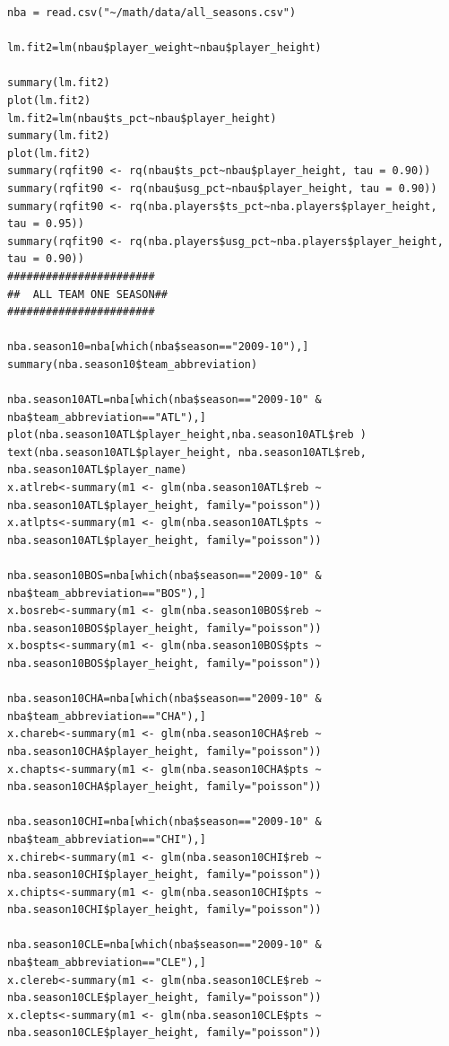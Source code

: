 \documentclass[11pt,letterpaper]{amsart}
\begin{document}
\begin{lstlisting}[breaklines]
nba = read.csv("~/math/data/all_seasons.csv")

lm.fit2=lm(nbau$player_weight~nbau$player_height)

summary(lm.fit2)
plot(lm.fit2)
lm.fit2=lm(nbau$ts_pct~nbau$player_height)
summary(lm.fit2)
plot(lm.fit2)
summary(rqfit90 <- rq(nbau$ts_pct~nbau$player_height, tau = 0.90))
summary(rqfit90 <- rq(nbau$usg_pct~nbau$player_height, tau = 0.90))
summary(rqfit90 <- rq(nba.players$ts_pct~nba.players$player_height, tau = 0.95))
summary(rqfit90 <- rq(nba.players$usg_pct~nba.players$player_height, tau = 0.90))
#######################
##  ALL TEAM ONE SEASON##
#######################

nba.season10=nba[which(nba$season=="2009-10"),]
summary(nba.season10$team_abbreviation)

nba.season10ATL=nba[which(nba$season=="2009-10" & nba$team_abbreviation=="ATL"),]
plot(nba.season10ATL$player_height,nba.season10ATL$reb )
text(nba.season10ATL$player_height, nba.season10ATL$reb, nba.season10ATL$player_name)
x.atlreb<-summary(m1 <- glm(nba.season10ATL$reb ~ nba.season10ATL$player_height, family="poisson"))
x.atlpts<-summary(m1 <- glm(nba.season10ATL$pts ~ nba.season10ATL$player_height, family="poisson"))

nba.season10BOS=nba[which(nba$season=="2009-10" & nba$team_abbreviation=="BOS"),]
x.bosreb<-summary(m1 <- glm(nba.season10BOS$reb ~ nba.season10BOS$player_height, family="poisson"))
x.bospts<-summary(m1 <- glm(nba.season10BOS$pts ~ nba.season10BOS$player_height, family="poisson"))

nba.season10CHA=nba[which(nba$season=="2009-10" & nba$team_abbreviation=="CHA"),]
x.chareb<-summary(m1 <- glm(nba.season10CHA$reb ~ nba.season10CHA$player_height, family="poisson"))
x.chapts<-summary(m1 <- glm(nba.season10CHA$pts ~ nba.season10CHA$player_height, family="poisson"))

nba.season10CHI=nba[which(nba$season=="2009-10" & nba$team_abbreviation=="CHI"),]
x.chireb<-summary(m1 <- glm(nba.season10CHI$reb ~ nba.season10CHI$player_height, family="poisson"))
x.chipts<-summary(m1 <- glm(nba.season10CHI$pts ~ nba.season10CHI$player_height, family="poisson"))

nba.season10CLE=nba[which(nba$season=="2009-10" & nba$team_abbreviation=="CLE"),]
x.clereb<-summary(m1 <- glm(nba.season10CLE$reb ~ nba.season10CLE$player_height, family="poisson"))
x.clepts<-summary(m1 <- glm(nba.season10CLE$pts ~ nba.season10CLE$player_height, family="poisson"))


\end{lstlisting}
\end{document}
